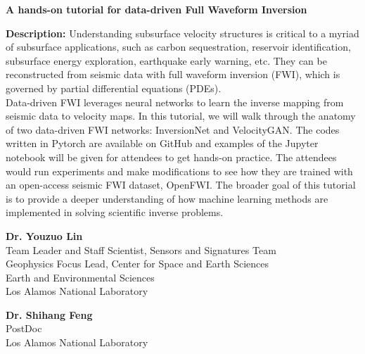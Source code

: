 \bigskip
{\bf A hands-on tutorial for data-driven Full Waveform Inversion}\label{tutorial}

\bigskip
{\bf Description:} Understanding subsurface velocity structures is critical to a myriad of subsurface applications, such as carbon sequestration, reservoir identification, subsurface energy exploration, earthquake early warning, etc. They can be reconstructed from seismic data with full waveform inversion (FWI), which is governed by partial differential equations (PDEs).\\
Data-driven FWI leverages neural networks to learn the inverse mapping from seismic data to velocity maps. In this tutorial, we will walk through the anatomy of two data-driven FWI networks: InversionNet and VelocityGAN. The codes written in Pytorch are available on GitHub and examples of the Jupyter notebook will be given for attendees to get hands-on practice. The attendees would run experiments and make modifications to see how they are trained with an open-access seismic FWI dataset, OpenFWI. The broader goal of this tutorial is to provide a deeper understanding of how machine learning methods are implemented in solving scientific inverse problems.\bigskip

{\bf Dr. Youzuo Lin}\\
Team Leader and Staff Scientist, Sensors and Signatures Team\\
Geophysics Focus Lead, Center for Space and Earth Sciences\\
Earth and Environmental Sciences\\
Los Alamos National Laboratory\bigskip

{\bf Dr. Shihang Feng}\\
PostDoc\\
Los Alamos National Laboratory
